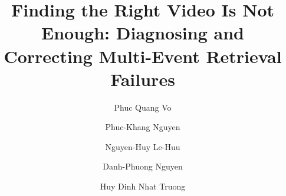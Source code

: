 \documentclass{llncs}
\begin{document}
\title{Finding the Right Video Is Not Enough: Diagnosing and Correcting Multi-Event Retrieval Failures}
\author{Phuc Quang Vo \and
Phuc-Khang Nguyen \and
Nguyen-Huy Le-Huu \and
Danh-Phuong Nguyen \and
Huy Dinh Nhat Truong}
\maketitle











\clearpage


\end{document}
